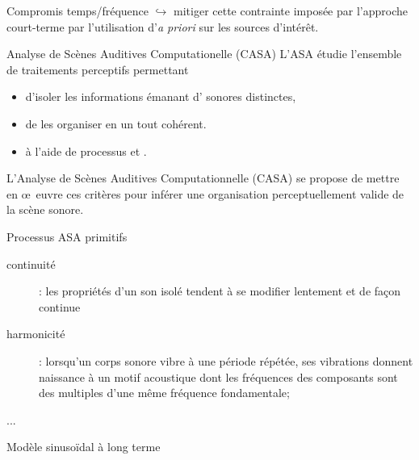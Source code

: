 \begin{frame}{Compromis temps/fréquence}
	$\hookrightarrow{}$ mitiger cette contrainte imposée par l'approche court-terme par l'utilisation d'\alert{\textit{a priori}} sur les sources d'intérêt.
\end{frame}

\begin{frame}{Analyse de Scènes Auditives Computationelle (CASA)}
L'ASA étudie l'ensemble de traitements perceptifs permettant
\begin{itemize}
\item d'isoler les informations émanant d' sonores distinctes,
\item de les organiser en un tout cohérent.
\item à l'aide de processus  et .
\end{itemize}
L'Analyse de Scènes Auditives Computationnelle (CASA) se propose de mettre en \oe~euvre ces critères pour inférer une organisation perceptuellement valide de la scène sonore.
\end{frame}

\begin{frame}{Processus ASA \og primitifs \fg}
\begin{description}
\item[\alert<2>{continuité}] : les propriétés d'un son isolé tendent à se modifier lentement et de façon continue
\item[harmonicité] : lorsqu'un corps sonore vibre à une période répétée, ses vibrations donnent naissance à un motif acoustique dont les fréquences des composants sont des multiples d'une même fréquence fondamentale;
\item[...]
\end{description}
\end{frame}

\begin{frame}{Modèle sinusoïdal à long terme}
\end{frame}

